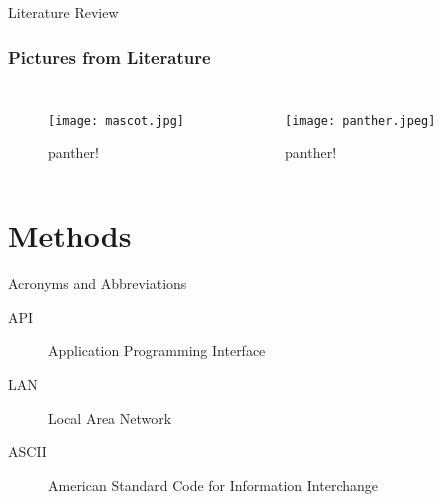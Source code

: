\documentclass[10pt]{beamer}
\begin{document}
\begin{frame}{Literature Review}
    \frametitle{Pictures from Literature}
    \begin{columns}
        \begin{figure}
        \texttt{[image: mascot.jpg]}
        \caption{panther!}
        \end{figure}
        \begin{figure}
        \texttt{[image: panther.jpeg]}
        \caption{panther!}
        \end{figure}
    
    \end{columns}
\end{frame}


\section{Methods}
    \begin{frame}{Acronyms and Abbreviations}
     \begin{description}
        \item[API] Application Programming Interface
        \item[LAN] Local Area Network
        \item[ASCII] American Standard Code for Information Interchange
    \end{description}
    \end{frame}
\end{document}
